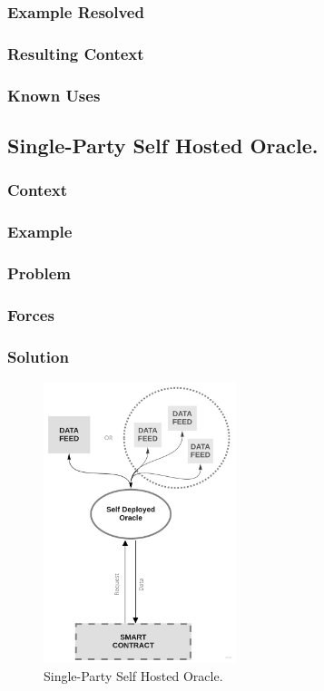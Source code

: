 \subsubsection{Example Resolved}
\subsubsection{Resulting Context}
\subsubsection{Known Uses}

\subsection{Single-Party Self Hosted Oracle.}

\subsubsection{Context}
\subsubsection{Example}
\subsubsection{Problem}
\subsubsection{Forces}
\subsubsection{Solution}

\begin{figure}[t]
  \begin{center}
    \leavevmode
    \includegraphics[width=0.5\textwidth]{figures/oraclearch3.jpg}
    \caption{Single-Party Self Hosted Oracle.}
    \label{fig:/figures/paper-screening}
  \end{center}
\end{figure}



